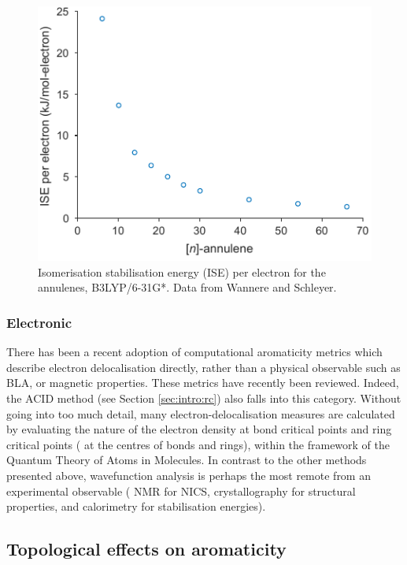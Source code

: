 			\begin{figure}[ht!]
				\centering\includegraphics{figures/intro/ise-vs-pielec.pdf} 
				\caption[]{Isomerisation stabilisation energy (ISE) per electron for the annulenes, B3LYP/6-31G*. Data from Wannere and Schleyer.\autocite{Wannere2003}}
				\label{fig:intro:isevspielec}
			\end{figure}



		\subsubsection{Electronic}

			There has been a recent adoption of computational aromaticity metrics which describe electron delocalisation directly, rather than a physical observable such as BLA, or magnetic properties. These metrics have recently been reviewed.\autocite{Feixas2015} Indeed, the ACID method (see Section \ref{sec:intro:rc}) also falls into this category. Without going into too much detail, many electron-delocalisation measures are calculated by evaluating the nature of the electron density at bond critical points and ring critical points ( at the centres of bonds and rings), within the framework of the Quantum Theory of Atoms in Molecules.\autocite{Palusiak2007} In contrast to the other methods presented above, wavefunction analysis is perhaps the most remote from an experimental observable ( NMR for NICS, crystallography for structural properties, and calorimetry for stabilisation energies).


	\subsection{Topological effects on aromaticity}

